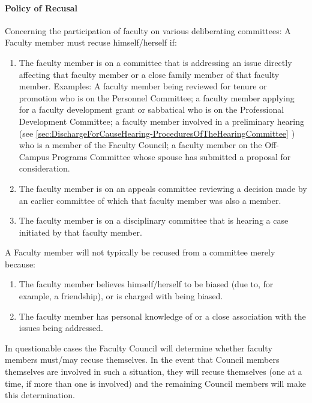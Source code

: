 			\paragraph{Policy of Recusal}
				Concerning the participation of faculty on various deliberating committees:  A Faculty member must recuse himself/herself if:
				\begin{enumerate}[label=\alph*)]
					\item{The faculty member is on a committee that is addressing an issue directly affecting that faculty member or a close family member of that faculty member.  Examples: A faculty member being reviewed for tenure or promotion who is on the Personnel Committee; a faculty member applying for a faculty development grant or sabbatical who is on the Professional Development Committee; a faculty member involved in a preliminary hearing (see
						\ref{sec:DischargeForCauseHearing-ProceduresOfTheHearingCommittee}
						) who is a member of the Faculty Council; a faculty member on the Off-Campus Programs Committee whose spouse has submitted a proposal for consideration.}
					\item{The faculty member is on an appeals committee reviewing a decision made by an earlier committee of which that faculty member was also a member.}
					\item{The faculty member is on a disciplinary committee that is hearing a case initiated by that faculty member.}
				\end{enumerate}
				A Faculty member will not typically be recused from a committee merely because:

				\begin{enumerate}[label=\alph*)]
					\item{The faculty member believes himself/herself to be biased (due to, for example, a  friendship), or is charged with being biased.}
					\item{The faculty member has personal knowledge of or a close association with the issues being addressed.}
				\end{enumerate}

				In questionable cases the Faculty Council will determine whether faculty members must/may recuse themselves.  In the event that Council members themselves are involved in such a situation, they will recuse themselves (one at a time, if more than one is involved) and the remaining Council members will make this determination.

